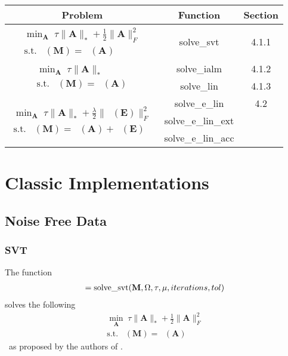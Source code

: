 \documentclass{article}
\DeclareMathOperator*{\pro}{\mathcal P_{\Omega}}
\begin{document}
\begin{table}[!h]
{\small{
\centering

\begin{tabular}{c | c | c}
\hline
Problem & Function & Section \\
\hline

$\begin{array}{c} \min_{\mathbf A} \; \tau \| \mathbf A \|_* +  \frac{1}{2} \| \mathbf{ A } \|_F^2 \\
\text{s.t.} \; \pro (\mathbf M) = \pro (\mathbf A) \end{array}$ & solve\_svt	& 4.1.1  \\
\hline

\multirow{2}{*}{$\begin{array}{c} \min_{\mathbf A} \; \tau \| \mathbf A \|_* \\
\text{s.t.} \; \pro (\mathbf M) = \pro (\mathbf A) \end{array}$} & solve\_ialm	& 4.1.2 \\
		& solve\_lin	& 4.1.3 \\
		
\hline
\multirow{3}{*}{$\begin{array}{c} \min_{\mathbf A} \; \tau \| \mathbf A \|_* + \frac{\lambda}{2} \| \pro (\mathbf E) \|_F^2 \\
\text{s.t.} \; \pro (\mathbf M) = \pro (\mathbf A) + \pro (\mathbf E)\end{array}$} & solve\_e\_lin & 4.2 \\
	& solve\_e\_lin\_ext & \\
	& solve\_e\_lin\_acc & \\

\end{tabular}
}}
\end{table}

\newpage
\section{Classic Implementations}
\subsection{Noise Free Data}
\subsubsection{SVT}

The function
\begin{align}
[ \mathbf A, \mathbf{f\_values}, \mathbf{stop\_vals} ] = \text{solve\_svt}( \mathbf M, \Omega, \tau, \mu, iterations, tol )\notag 
\end{align}
solves the following
\begin{align}
\min_{\mathbf A} \; \tau \| \mathbf A \|_* +  \frac{1}{2} \| \mathbf{ A } \|_F^2 \\
\text{s.t.} \; \pro (\mathbf M) = \pro (\mathbf A) \nonumber 
\end{align}\
as proposed by the authors of \cite{cai2010singular}.
\end{document}
